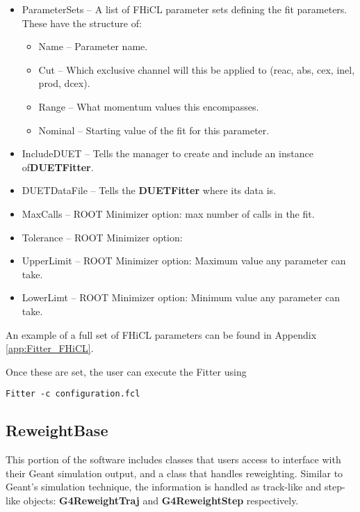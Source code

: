 \documentclass[12pt]{article}
\begin{document}
\begin{itemize}
\begin{itemize}
	\end{itemize}
	\item ParameterSets -- A list of FHiCL parameter sets defining the fit parameters. These have the structure of:
	\begin{itemize}
		\item Name -- Parameter name.		
		\item Cut -- Which exclusive channel will this be applied to (reac, abs, cex, inel, prod, dcex).
		\item Range -- What momentum values this encompasses.
		\item Nominal -- Starting value of the fit for this parameter. 
    \end{itemize}	 
    
    \item IncludeDUET -- Tells the manager to create and include an instance of\textbf{DUETFitter}.
    \item DUETDataFile -- Tells the \textbf{DUETFitter} where its data is.
    \item MaxCalls -- ROOT Minimizer option: max number of calls in the fit.
    \item Tolerance -- ROOT Minimizer option:
    \item UpperLimit -- ROOT Minimizer option: Maximum value any parameter can take.
    \item LowerLimt -- ROOT Minimizer option: Minimum value any parameter can take.
\end{itemize}

An example of a full set of FHiCL parameters can be found in Appendix \ref{app:Fitter_FHiCL}.

Once these are set, the user can execute the Fitter using

\begin{lstlisting}
Fitter -c configuration.fcl
\end{lstlisting}

\subsection{ReweightBase}\label{ssec:ReweightBase}
This portion of the software includes classes that users access to interface with their Geant  simulation output, and a class that handles reweighting. Similar to Geant's simulation technique, the information is handled as track-like and step-like objects: \textbf{G4ReweightTraj} and \textbf{G4ReweightStep }respectively.
\end{document}
